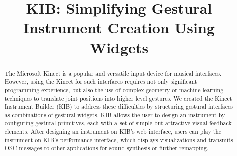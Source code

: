\documentclass{nime-alternate}
\begin{document}
%

\title{KIB: Simplifying Gestural Instrument Creation Using Widgets}

%
%
%
%
%

\maketitle
\begin{abstract}
The Microsoft Kinect is a popular and versatile input device for musical interfaces.
However, using the Kinect for such interfaces requires not only significant programming
experience, but also the use of complex geometry or machine learning techniques to translate joint
positions into higher level gestures. We created the Kinect Instrument Builder (KIB) to
address these difficulties by structuring gestural interfaces as combinations of gestural
widgets. KIB allows the user to design an instrument by configuring gestural primitives,
each with a set of simple but attractive visual feedback elements. After designing an instrument
on KIB's web interface, users can play the instrument on KIB's performance interface, 
which displays visualizations and transmits OSC messages to other applications for sound synthesis
or further remapping.
\end{abstract}

\end{document}
